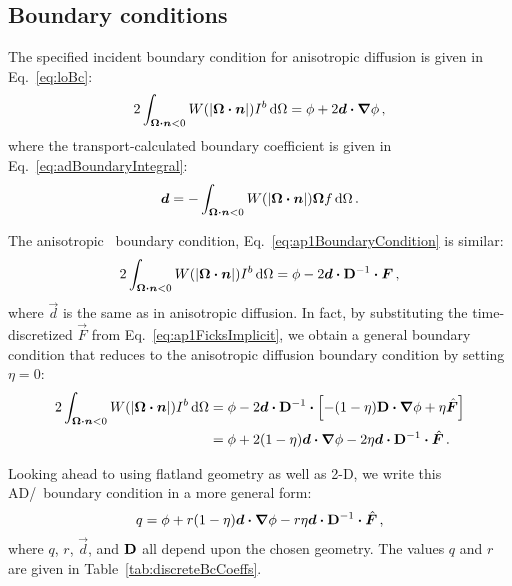 \subsection{Boundary conditions}

The specified incident boundary condition for anisotropic diffusion is given in
Eq.~\eqref{eq:loBc}:
\begin{equation*}
2\int_{\bm{\Omega}\bm{\cdot}\bm{n} < 0} W(\left| \bm{\Omega}\bm{\cdot}\bm{n} \right|)
I^b \mathop{}\!\mathrm{d}\Omega
=
\phi
+ 2 \bm{d} \bm{\cdot} \bm{\nabla} \phi\,,
\end{equation*}
where the transport-calculated boundary coefficient is given in
Eq.~\eqref{eq:adBoundaryIntegral}:
\begin{equation*}
  \bm{d} = -\int_{\bm{\Omega}\bm{\cdot}\bm{n} < 0} W(\left| \bm{\Omega}\bm{\cdot}\bm{n} \right|)
\bm{\Omega} f \mathop{}\!\mathrm{d}\Omega\,.
\end{equation*}

The anisotropic \Pone\ boundary condition, Eq.~\eqref{eq:ap1BoundaryCondition}
is similar:
\begin{equation*}
  2 \int_{\bm{\Omega}\bm{\cdot}\bm{n} < 0}
  W(\left| \bm{\Omega}\bm{\cdot}\bm{n} \right|) I^b \mathop{}\!\mathrm{d}\Omega
  = \phi
  - 2 \bm{d} \bm{\cdot} \mathbf{D}^{-1} \bm{\cdot} \bm{F} \,,
\end{equation*}
where $\vec{d}$ is the same as in anisotropic diffusion.
In fact, by substituting the time-discretized $\vec{F}$ from
Eq.~\eqref{eq:ap1FicksImplicit}, we obtain a general boundary condition that
reduces to the anisotropic diffusion boundary condition by setting $\eta=0$:
\begin{align*}
  2 \int_{\bm{\Omega}\bm{\cdot}\bm{n} < 0}
  W(\left| \bm{\Omega}\bm{\cdot}\bm{n} \right|) I^b \mathop{}\!\mathrm{d}\Omega
  &= \phi
  - 2 \bm{d} \bm{\cdot} \mathbf{D}^{-1} \bm{\cdot} 
  \left[ - (1 - \eta)\mathbf{D} \bm{\cdot} \bm{\nabla} \phi + \eta \hat{\bm{F}} \right]
  \\
  &=  \phi + 2 (1 - \eta) \bm{d} \bm{\cdot} \bm{\nabla} \phi
  - 2 \eta \bm{d} \bm{\cdot} \mathbf{D}^{-1} \bm{\cdot} \hat{\bm{F}} \,.
\end{align*}

Looking ahead to using flatland geometry as well as 2-D, we write this
AD/\APone\ boundary condition in a more general form:
\begin{equation}\label{eq:discreteBcGeneral}
  q = \phi + r (1 - \eta) \bm{d} \bm{\cdot} \bm{\nabla} \phi
  - r \eta \bm{d} \bm{\cdot} \mathbf{D}^{-1} \bm{\cdot} \hat{\bm{F}}\,,
\end{equation}
where $q$, $r$, $\vec{d}$, and $\mathbf{D}$ all depend upon the chosen geometry. The
values $q$ and $r$ are given in Table~\ref{tab:discreteBcCoeffs}.

